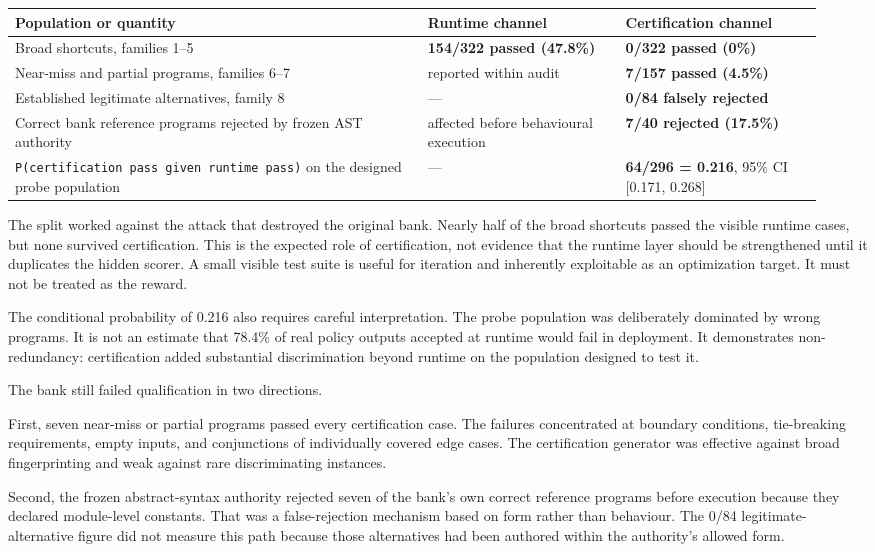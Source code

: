 \documentclass[
  9pt,
  letterpaper,
]{article}
\begin{document}
\begin{longtable}[]{@{}p{0.48\linewidth}p{0.23\linewidth}p{0.23\linewidth}@{}}
\toprule\noalign{}
Population or quantity & Runtime channel & Certification channel \\
\midrule\noalign{}
\endhead
\bottomrule\noalign{}
\endlastfoot
Broad shortcuts, families 1--5 & \textbf{154/322 passed (47.8\%)} &
\textbf{0/322 passed (0\%)} \\
Near-miss and partial programs, families 6--7 & reported within audit &
\textbf{7/157 passed (4.5\%)} \\
Established legitimate alternatives, family 8 & --- & \textbf{0/84
falsely rejected} \\
Correct bank reference programs rejected by frozen AST authority &
affected before behavioural execution & \textbf{7/40 rejected
(17.5\%)} \\
\texttt{P(certification\ pass\ given\ runtime\ pass)} on the designed
probe population & --- & \textbf{64/296 = 0.216}, 95\% CI {[}0.171,
0.268{]} \\
\end{longtable}

The split worked against the attack that destroyed the original bank.
Nearly half of the broad shortcuts passed the visible runtime cases, but
none survived certification. This is the expected role of certification,
not evidence that the runtime layer should be strengthened until it
duplicates the hidden scorer. A small visible test suite is useful for
iteration and inherently exploitable as an optimization target. It must
not be treated as the reward.

The conditional probability of 0.216 also requires careful
interpretation. The probe population was deliberately dominated by wrong
programs. It is not an estimate that 78.4\% of real policy outputs
accepted at runtime would fail in deployment. It demonstrates
non-redundancy: certification added substantial discrimination beyond
runtime on the population designed to test it.

The bank still failed qualification in two directions.

First, seven near-miss or partial programs passed every certification
case. The failures concentrated at boundary conditions, tie-breaking
requirements, empty inputs, and conjunctions of individually covered
edge cases. The certification generator was effective against broad
fingerprinting and weak against rare discriminating instances.

Second, the frozen abstract-syntax authority rejected seven of the
bank's own correct reference programs before execution because they
declared module-level constants. That was a false-rejection mechanism
based on form rather than behaviour. The 0/84 legitimate-alternative
figure did not measure this path because those alternatives had been
authored within the authority's allowed form.
\end{document}
